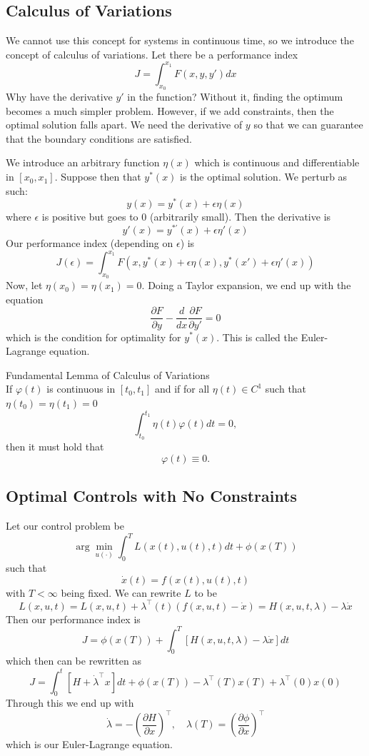 \documentclass{article}
\begin{document}
\subsection{Calculus of Variations}

We cannot use this concept for systems in continuous time, so we introduce the concept of
calculus of variations. Let there be a performance index
\[J = \int_{x_0}^{x_1}F(x,y,y')dx\]
Why have the derivative $y'$ in the function? Without it, finding the optimum becomes a
much simpler problem. However, if we add constraints, then the optimal solution falls apart.
We need the derivative of $y$ so that we can guarantee that the boundary conditions are satisfied.

\noindent
We introduce an arbitrary function $\eta(x)$ which is continuous and differentiable in $[x_0, x_1]$.
Suppose then that $y^*(x)$ is the optimal solution. We perturb as such:
\[y(x) = y^*(x) + \epsilon\eta(x)\]
where $\epsilon$ is positive but goes to 0 (arbitrarily small).
Then the derivative is
\[y'(x) = y^{*'}(x) + \epsilon\eta'(x)\]
Our performance index (depending on $\epsilon$) is
\[J(\epsilon) = \int_{x_0}^{x_1}F(x,y^*(x)+\epsilon\eta(x),y^*(x')+\epsilon\eta'(x))\]
Now, let $\eta(x_0) = \eta(x_1) = 0$. Doing a Taylor expansion, we end up with the equation
\[\frac{\partial F}{\partial y} - \frac{d}{dx}\frac{\partial F}{\partial y'} = 0\]
which is the condition for optimality for $y^*(x)$. This is called the Euler-Lagrange equation.
\begin{theorem}
    Fundamental Lemma of Calculus of Variations\\[2mm]
    If $\varphi(t)$ is continuous in $[t_0,t_1]$ and if for all $\eta(t) \in C^1$ such that
    $\eta(t_0) = \eta(t_1) = 0$
    \[\int_{t_0}^{t_1}\eta(t)\varphi(t)dt = 0,\]
    then it must hold that
    \[\varphi(t) \equiv 0.\] 
\end{theorem}

\subsection{Optimal Controls with No Constraints}

Let our control problem be
\[\arg\min_{u(\cdot)}\int_{0}^{T}L(x(t),u(t),t)dt + \phi(x(T))\]
such that
\[\dot{x}(t) = f(x(t),u(t),t)\]
with $T < \infty$ being fixed. We can rewrite $L$ to be
\[L(x,u,t) = L(x,u,t) + \lambda^\top(t)(f(x,u,t)-\dot{x}) = H(x,u,t,\lambda)-\lambda\dot{x}\]
Then our performance index is
\[J = \phi(x(T)) + \int_{0}^{T}[H(x,u,t,\lambda)-\lambda\dot{x}]dt\]
which then can be rewritten as
\[J = \int_{0}^{t}[H + \dot{\lambda}^\top x]dt + \phi(x(T)) - \lambda^\top(T)x(T) + \lambda^\top(0)x(0)\]
Through this we end up with
\[\dot{\lambda} = -\left(\frac{\partial H}{\partial x}\right)^\top,\quad
\lambda(T) = \left(\frac{\partial\phi}{\partial x}\right)^\top\]
which is our Euler-Lagrange equation.
\end{document}

